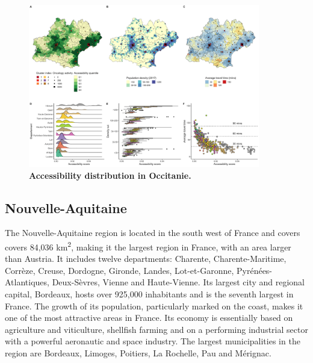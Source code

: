 \begin{figure}[H]
    \includegraphics[width=0.9\textwidth]{images/camion/region_accessibility/accessibility_Occitanie.png}
    \centering
    \caption{
        \textbf{Accessibility distribution in Occitanie.}
    }
\end{figure}

\subsection*{Nouvelle-Aquitaine}

The Nouvelle-Aquitaine region is located in the south west of France and covers
covers 84,036 km\textsuperscript{2}, making it the largest region in France,
with an area larger than Austria. It includes twelve departments: Charente,
Charente-Maritime, Corrèze, Creuse, Dordogne, Gironde, Landes, Lot-et-Garonne,
Pyrénées-Atlantiques, Deux-Sèvres, Vienne and Haute-Vienne. Its largest city and
regional capital, Bordeaux, hosts over 925,000 inhabitants and is the seventh
largest in France. The growth of its population, particularly marked on the
coast, makes it one of the most attractive areas in France. Its economy is
essentially based on agriculture and viticulture, shellfish farming and on a
performing industrial sector with a powerful aeronautic and space industry. The
largest municipalities in the region are Bordeaux, Limoges, Poitiers, La
Rochelle, Pau and Mérignac.

